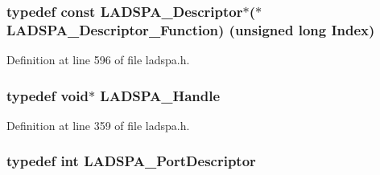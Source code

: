 \subsubsection[{\texorpdfstring{L\+A\+D\+S\+P\+A\+\_\+\+Descriptor\+\_\+\+Function}{LADSPA_Descriptor_Function}}]{\setlength{\rightskip}{0pt plus 5cm}typedef {\bf const} {\bf L\+A\+D\+S\+P\+A\+\_\+\+Descriptor}$\ast$($\ast$ L\+A\+D\+S\+P\+A\+\_\+\+Descriptor\+\_\+\+Function) (unsigned long Index)}\hypertarget{win_2_l_a_d_s_p_a__plugins-win_2ladspa_8h_a88530a3e12094d9d38c7422299f9d136}{}\label{win_2_l_a_d_s_p_a__plugins-win_2ladspa_8h_a88530a3e12094d9d38c7422299f9d136}


Definition at line 596 of file ladspa.\+h.

\subsubsection[{\texorpdfstring{L\+A\+D\+S\+P\+A\+\_\+\+Handle}{LADSPA_Handle}}]{\setlength{\rightskip}{0pt plus 5cm}typedef {\bf void}$\ast$ {\bf L\+A\+D\+S\+P\+A\+\_\+\+Handle}}\hypertarget{win_2_l_a_d_s_p_a__plugins-win_2ladspa_8h_add2c8d62e2cb03e4fd16ab3f997d4195}{}\label{win_2_l_a_d_s_p_a__plugins-win_2ladspa_8h_add2c8d62e2cb03e4fd16ab3f997d4195}


Definition at line 359 of file ladspa.\+h.

\subsubsection[{\texorpdfstring{L\+A\+D\+S\+P\+A\+\_\+\+Port\+Descriptor}{LADSPA_PortDescriptor}}]{\setlength{\rightskip}{0pt plus 5cm}typedef {\bf int} {\bf L\+A\+D\+S\+P\+A\+\_\+\+Port\+Descriptor}}\hypertarget{win_2_l_a_d_s_p_a__plugins-win_2ladspa_8h_a90f9a17bef9e9a9c5e34f2a1973379e2}{}\label{win_2_l_a_d_s_p_a__plugins-win_2ladspa_8h_a90f9a17bef9e9a9c5e34f2a1973379e2}


